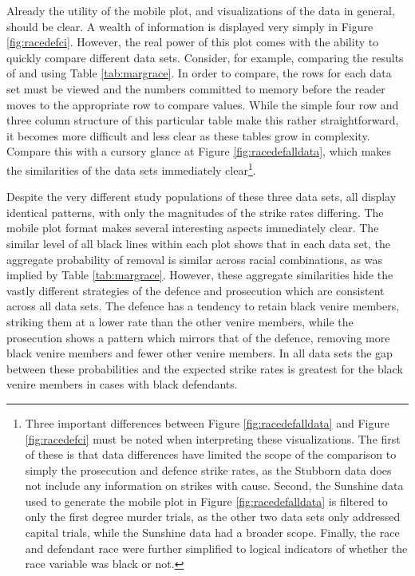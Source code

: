 Already the utility of the mobile plot, and visualizations of the data in general, should be clear. A wealth of information is
displayed very simply in Figure \ref{fig:racedefci}. However, the real power of this plot comes with the ability to quickly
compare different data sets. Consider, for example, comparing the results of \cite{PerempChalMurder} and \cite{StubbornLegacy}
using Table \ref{tab:margrace}. In order to compare, the rows for each data set must be viewed and the numbers
committed to memory before the reader moves to the appropriate row to compare values. While the simple four row and three column
structure of this particular table make this rather straightforward,
it becomes more difficult and less clear as these tables grow
in complexity. Compare this with a cursory glance at Figure \ref{fig:racedefalldata}, which makes the similarities of the data
sets immediately clear\footnote{Three important differences between Figure \ref{fig:racedefalldata} and Figure \ref{fig:racedefci}
  must be noted when interpreting these visualizations. The first of these is that data differences have limited the scope of
  the comparison to simply the prosecution and defence strike rates, as the Stubborn data does not include any information on
  strikes with cause. Second, the Sunshine data used to generate the mobile plot in Figure \ref{fig:racedefalldata} is filtered to
  only the first degree murder trials, as the other two data sets only addressed capital trials, while the Sunshine data had a broader scope. Finally, the race and defendant race were further simplified to
  logical indicators of whether the race variable was black or not.}.

Despite the very different study populations of these three data sets, all display identical patterns, with only the
magnitudes of the strike rates differing. The mobile plot format makes several interesting aspects immediately
clear. The similar level of all black lines within each plot shows that in each data set, the aggregate probability of removal is
similar across racial combinations, as was implied by Table \ref{tab:margrace}. However, these aggregate similarities
hide the vastly different strategies of the defence and prosecution which are consistent across all data sets. The defence has a
tendency to retain black venire members, striking them at a lower rate
than the other venire members, while the
prosecution shows a pattern which mirrors that of the defence,
removing more black venire members and fewer other venire members. In
all data sets the gap between these probabilities and the expected strike rates is greatest for the black venire members in cases
with black defendants.

